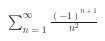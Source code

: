 \documentclass[preview]{standalone}
\begin{document}
\begin{align*}
\sum_{n=1}^{\infty} \frac{(-1)^{n+1}}{n^2}
\end{align*}
\end{document}
